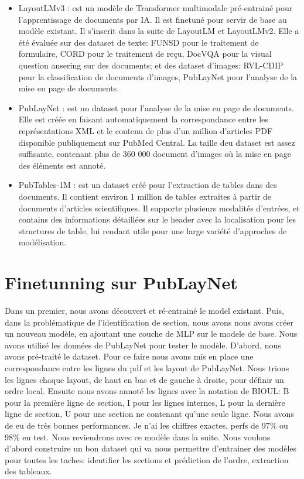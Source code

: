 \documentclass{report}
\begin{document}
\begin{multicols}{2}
    \begin{itemize}
        \item LayoutLMv3 \cite{layoutlmv3}: est un modèle de Transformer multimodale  pré-entrainé pour l’apprentissage de documents par IA. Il est finetuné pour servir de base au modèle existant. Il s’inscrit dans la suite de LayoutLM et LayoutLMv2. Elle a été évaluée sur des dataset de texte: FUNSD pour le traitement de formulaire, CORD pour le traitement de reçu, DocVQA pour la visual question ansering sur des documents; et des dataset d'images: RVL-CDIP pour la classification de documents d'images, PubLayNet pour l'analyse de la mise en page de documents.
        
        \item PubLayNet \cite{publaynet}: est un dataset pour l'analyse de la mise en page de documents. Elle est créée en faisant automatiquement la correspondance entre les représentations XML et le contenu de plus d'un million d'articles PDF disponible publiquement sur PubMed Central. La taille deu dataset est assez suffisante, contenant plus de 360 000 document d'images où la mise en page des éléments est annoté.
        
        \item PubTables-1M \cite{pubtables}: est un dataset créé pour l'extraction de tables dans des documents. Il contient environ 1 million de tables extraites à partir de documents d'articles scientifiques. Il supporte plusieurs modalités d'entrées, et contains des informations détaillées sur le header avec la localisation pour les structures de table, lui rendant utile pour une large variété d'approches de modélisation.
        
        
    \end{itemize}

    \section{Finetunning sur PubLayNet}
    Dans un premier, nous avons découvert et ré-entrainé le model existant. Puis, dans la problématique de l'identification de section, nous avons nous avons créer un nouveau modèle, en ajoutant une couche de MLP sur le modele de base. Nous avons utilisé les données de PubLayNet pour tester le modèle. D'abord, nous avons pré-traité le dataset. Pour ce faire nous avons mis en place une correspondance entre les lignes du pdf et les layout de PubLayNet. Nous trions les lignes chaque layout, de haut en bas et de gauche à droite, pour définir un ordre local. Ensuite nous avons annoté les lignes avec la notation de BIOUL: B pour la première ligne de section, I pour les lignes internes, L pour la dernière ligne de section, U pour une section ne contenant qu'une seule ligne. Nous avons de eu de très bonnes performances. Je n'ai les chiffres exactes, perfs de 97\% ou 98\% en test. Nous reviendrons avec ce modèle dans la suite. Nous voulons d'abord construire un bon dataset qui va nous permettre d'entrainer des modèles pour toutes les taches: identifier les sections et prédiction de l'ordre, extraction des tableaux. 

\end{multicols}
\end{document}

